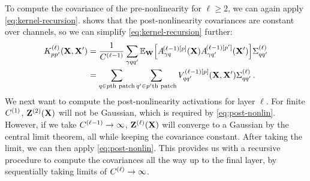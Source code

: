 \documentclass{article}
\theoremstyle{definition}
\newcommand{\vX}{\mathbf{X}}
\newcommand{\vW}{\mathbf{W}}
\begin{document}
To compute the covariance of the pre-nonlinearity for $\ell\geq 2$, we can again apply \cref{eq:kernel-recursion}.  shows that the post-nonlinearity covariances are constant over channels, so we can simplify \cref{eq:kernel-recursion} further:
\begin{align}
    K_{pp'}^{(\ell)}(\vX, \vX') &= \frac{1}{\layerC{\ell-1}} \sum_{\gamma qq'} \Exp{\vW}{\layerNLAs{(\ell-1)[p]}{\gamma q} \layerNLAsd{(\ell-1)[p']}{\gamma q'}} \priorWcovs{\ell}_{qq'} \nonumber \\
    &= \sum_{q \in p\text{th patch}}\sum_{q'\in p'\text{th patch}} V_{qq'}^{(\ell-1)[p]}(\vX,\vX') \priorWcovs{\ell}_{qq'} \,.
\end{align}
We next want to compute the post-nonlinearity activations for layer $\ell$. For finite $C^{(1)}$, $\layerA{2}{}$ will not be Gaussian, which is required by \cref{eq:post-nonlin}. However, if we take $C^{(\ell-1)}\to\infty$, $\layerA{\ell}{}$ will converge to a Gaussian by the central limit theorem, all while keeping the covariance constant. After taking the limit, we can then apply \cref{eq:post-nonlin}. This provides us with a recursive procedure to compute the covariances all the way up to the final layer, by sequentially taking limits of $C^{(\ell)}\to\infty$. %

\end{document}
